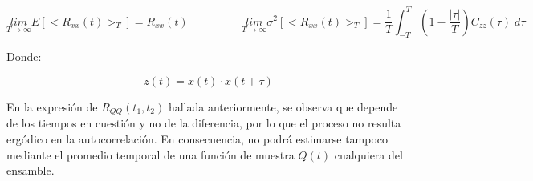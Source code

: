 \[
\underset{T \rightarrow \infty}{lim} E[<R_{xx}(t)>_T] = R_{xx}(t) \hspace{2cm} \underset{T \rightarrow \infty}{lim} \sigma^2[<R_{xx}(t)>_T] = \frac{1}{T} \int^{T}_{-T} \left( 1-\frac{|\tau|}{T} \right) C_{zz}(\tau) \; d\tau
\]
\par
Donde:

\[
z(t) = x(t) \cdot x(t+\tau) 
\]

En la expresi\'on de $R_{QQ}(t_1,t_2)$ hallada anteriormente, se observa que depende de los tiempos en cuesti\'on y no de la diferencia, por lo que el proceso no resulta erg\'odico en la autocorrelaci\'on. En consecuencia, no podr\'a estimarse tampoco mediante el promedio temporal de una funci\'on de muestra $Q(t)$ cualquiera del ensamble.

